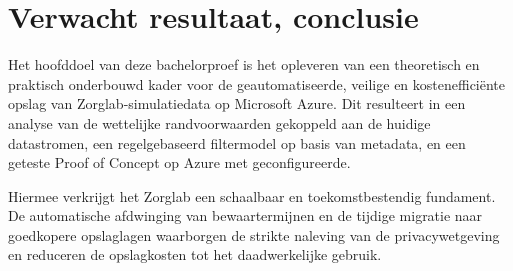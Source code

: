 \section{Verwacht resultaat, conclusie}
\label{sec:verwachte_resultaten}

Het hoofddoel van deze bachelorproef is het opleveren van een theoretisch en praktisch onderbouwd kader voor de geautomatiseerde, veilige en kostenefficiënte opslag van Zorglab-simulatiedata op Microsoft Azure. Dit resulteert in een analyse van de wettelijke randvoorwaarden gekoppeld aan de huidige datastromen, een regelgebaseerd filtermodel op basis van metadata, en een geteste Proof of Concept op Azure met geconfigureerde.

Hiermee verkrijgt het Zorglab een schaalbaar en toekomstbestendig fundament. De automatische afdwinging van bewaartermijnen en de tijdige migratie naar goedkopere opslaglagen waarborgen de strikte naleving van de privacywetgeving en reduceren de opslagkosten tot het daadwerkelijke gebruik.
